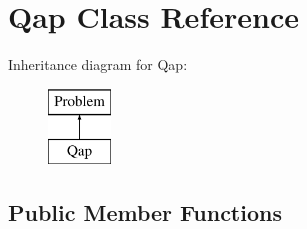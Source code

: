 \hypertarget{class_qap}{\section{Qap Class Reference}
\label{class_qap}
}
Inheritance diagram for Qap\+:\begin{figure}[H]
\begin{center}
\leavevmode
\includegraphics[height=2.000000cm]{class_qap}
\end{center}
\end{figure}
\subsection*{Public Member Functions}
